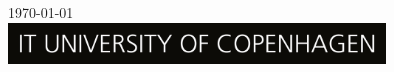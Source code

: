 \begin{titlepage}

{\today}\\[1cm] %


\includegraphics[width=10cm]{img/logo.jpg}\\[1cm] %


\vfill %

\end{titlepage}
